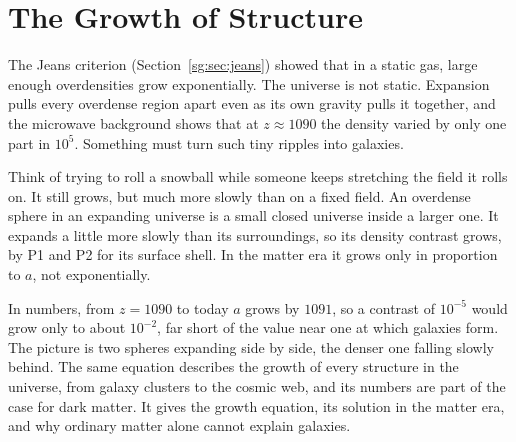 \section{The Growth of Structure}
\label{un:sec:growth}

The Jeans criterion (Section~\ref{sg:sec:jeans}) showed that in a static gas, large enough overdensities grow exponentially. The universe is not static. Expansion pulls every overdense region apart even as its own gravity pulls it together, and the microwave background shows that at $z\approx1090$ the density varied by only one part in $10^5$. Something must turn such tiny ripples into galaxies.

Think of trying to roll a snowball while someone keeps stretching the field it rolls on. It still grows, but much more slowly than on a fixed field. An overdense sphere in an expanding universe is a small closed universe inside a larger one. It expands a little more slowly than its surroundings, so its density contrast grows, by P1 and P2 for its surface shell. In the matter era it grows only in proportion to $a$, not exponentially.

In numbers, from $z=1090$ to today $a$ grows by $1091$, so a contrast of $10^{-5}$ would grow only to about $10^{-2}$, far short of the value near one at which galaxies form. The picture is two spheres expanding side by side, the denser one falling slowly behind. The same equation describes the growth of every structure in the universe, from galaxy clusters to the cosmic web, and its numbers are part of the case for dark matter. It gives the growth equation, its solution in the matter era, and why ordinary matter alone cannot explain galaxies.

